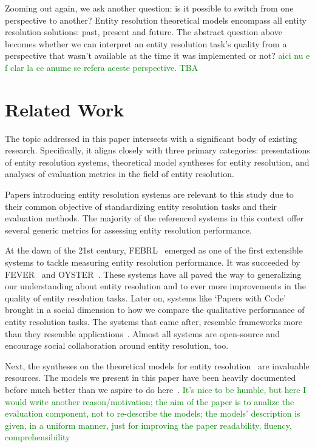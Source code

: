 \documentclass[journal]{IEEEtran}
\begin{document}
    Zooming out again, we ask another question: is it possible to switch from
    one perspective to another?
    Entity resolution theoretical models encompass all entity resolution
    solutions: past, present and future.
    The abstract question above becomes whether we can interpret an entity
    resolution task's quality from a perspective that wasn't available at the
    time it was implemented or not?
    \textcolor{green}{aici nu e f clar la ce anume se refera aceste perspective. TBA}

    \section{Related Work}\label{sec:related}
    
    The topic addressed in this paper intersects with a significant body of
    existing research.
    Specifically, it aligns closely with three primary categories: presentations
    of entity resolution systems, theoretical model syntheses for entity
    resolution, and analyses of evaluation metrics in the field of entity
    resolution.

    Papers introducing entity resolution systems are relevant to this study due
    to their common objective of standardizing entity resolution tasks and their
    evaluation methods.
    The majority of the referenced systems in this context offer several generic
    metrics for assessing entity resolution performance.

    At the dawn of the 21st century, FEBRL~\cite{febrl2002} emerged as one of the
    first extensible systems to tackle measuring entity resolution performance.
    It was succeeded by FEVER~\cite{fever2009} and OYSTER~\cite{oyster2012}.
    These systems have all paved the way to generalizing our understanding about
    entity resolution and to ever more improvements in the quality of entity
    resolution tasks.
    Later on, systems like `Papers with Code'~\cite{papwithcode2019} brought in
    a social dimension to how we compare the qualitative performance of entity
    resolution tasks.
    The systems that came after, resemble frameworks more than they resemble
    applications~\cite{magellan2020,jedai2017}.
    Almost all systems are open-source and encourage social collaboration around
    entity resolution, too.
    
    Next, the syntheses on the theoretical models for entity
    resolution~\cite{fs1969,Ben2009Swoosh,Tal11} are invaluable resources.
    The models we present in this paper have been heavily documented before much
    better than we aspire to do here~\cite{Tal11,tal2013}.
    \textcolor{green}{It's nice to be humble, but here I would write another reason/motivation; the aim of the paper is to analize the evaluation component, not to re-describe the models; the models' description is given, in a uniform manner, just for improving the paper readability, fluency, comprehensibility}
    
\end{document}
